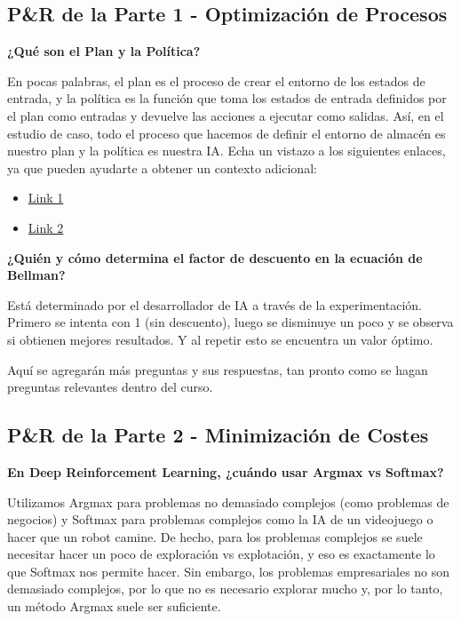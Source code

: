 \documentclass[
]{book}
\providecommand{\tightlist}{%
  \setlength{\itemsep}{0pt}\setlength{\parskip}{0pt}}
\begin{document}
\hypertarget{pr-de-la-parte-1---optimizaciuxf3n-de-procesos}{%
\subsection{P\&R de la Parte 1 - Optimización de Procesos}\label{pr-de-la-parte-1---optimizaciuxf3n-de-procesos}}

\textbf{¿Qué son el Plan y la Política?}

En pocas palabras, el plan es el proceso de crear el entorno de los estados de entrada, y la política es la función que toma los estados de entrada definidos por el plan como entradas y devuelve las acciones a ejecutar como salidas. Así, en el estudio de caso, todo el proceso que hacemos de definir el entorno de almacén es nuestro plan y la política es nuestra IA. Echa un vistazo a los siguientes enlaces, ya que pueden ayudarte a obtener un contexto adicional:

\begin{itemize}
\tightlist
\item
  \href{http://www-anw.cs.umass.edu/~barto/courses/cs687/Chapter\%209.pdf}{Link 1}
\item
  \href{https://www.quora.com/In-artificial-intelligence-which-is-better-policies-or-plans-and-why}{Link 2}
\end{itemize}

\textbf{¿Quién y cómo determina el factor de descuento en la ecuación de Bellman?}

Está determinado por el desarrollador de IA a través de la experimentación. Primero se intenta con 1 (sin descuento), luego se disminuye un poco y se observa si obtienen mejores resultados. Y al repetir esto se encuentra un valor óptimo.

Aquí se agregarán más preguntas y sus respuestas, tan pronto como se hagan preguntas relevantes dentro del curso.

\hypertarget{pr-de-la-parte-2---minimizaciuxf3n-de-costes}{%
\subsection{P\&R de la Parte 2 - Minimización de Costes}\label{pr-de-la-parte-2---minimizaciuxf3n-de-costes}}

\textbf{En Deep Reinforcement Learning, ¿cuándo usar Argmax vs Softmax?}

Utilizamos Argmax para problemas no demasiado complejos (como problemas de negocios) y Softmax para problemas complejos como la IA de un videojuego o hacer que un robot camine. De hecho, para los problemas complejos se suele necesitar hacer un poco de exploración vs explotación, y eso es exactamente lo que Softmax nos permite hacer. Sin embargo, los problemas empresariales no son demasiado complejos, por lo que no es necesario explorar mucho y, por lo tanto, un método Argmax suele ser suficiente.
\end{document}
